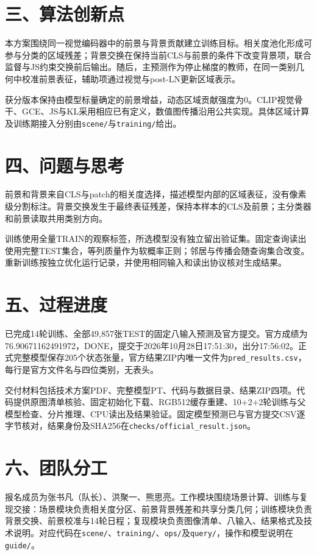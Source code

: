 \documentclass[UTF8,fontset=none,zihao=-4]{ctexart}
\newcommand{\code}[1]{\nolinkurl{#1}}
\begin{document}
\section*{三、算法创新点}
本方案围绕同一视觉编码器中的前景与背景贡献建立训练目标。相关度池化形成可参与分类的区域残差；背景交换在保持当前CLS与前景的条件下改变背景项，联合监督与JS约束交换前后输出。随后，主预测作为停止梯度的教师，在同一类别几何中校准前景表征，辅助项通过视觉与post-LN更新区域表示。

获分版本保持由模型标量确定的前景增益，动态区域贡献强度为0。CLIP视觉骨干、GCE、JS与KL采用相应已有定义，数值图传播沿用公共实现。具体区域计算及训练期接入分别由\code{scene/}与\code{training/}给出。

\section*{四、问题与思考}
前景和背景来自CLS与patch的相关度选择，描述模型内部的区域表征，没有像素级分割标注。背景交换发生于最终表征残差，保持本样本的CLS及前景；主分类器和前景读取共用类别方向。

训练使用全量TRAIN的观察标签，所选模型没有独立留出验证集。固定查询读出使用完整TEST集合，等列质量作为软概率正则；邻居与传播会随查询集合改变。重新训练按独立优化运行记录，并使用相同输入和读出协议核对生成结果。

\section*{五、过程进度}
已完成14轮训练、全部49,857张TEST的固定八输入预测及官方提交。官方成绩为76.90671162491972，DONE，提交于2026年10月28日17:51:30，出分17:56:02。正式完整模型保存205个状态张量，官方结果ZIP内唯一文件为\code{pred_results.csv}，每行是官方文件名与四位类别，无表头。

交付材料包括技术方案PDF、完整模型PT、代码与数据目录、结果ZIP四项。代码提供原图清单核验、固定初始化下载、RGB512缓存重建、10+2+2轮训练与父模型检查、分片推理、CPU读出及结果验证。固定模型预测已与官方提交CSV逐字节核对，结果身份及SHA256在\code{checks/official_result.json}。

\section*{六、团队分工}
报名成员为张书凡（队长）、洪聚一、熊思亮。工作模块围绕场景计算、训练与复现交接：场景模块负责相关度分区、前景背景残差和共享分类几何；训练模块负责背景交换、前景校准与14轮日程；复现模块负责图像清单、八输入、结果格式及技术说明。对应代码在\code{scene/}、\code{training/}、\code{ops/}及\code{query/}，操作和模型说明在\code{guide/}。
\end{document}
